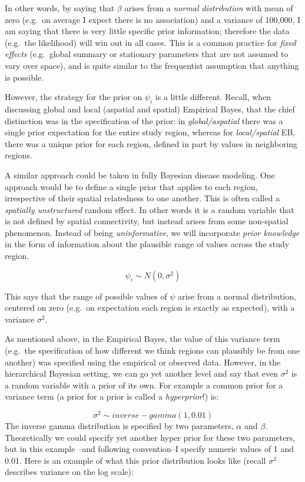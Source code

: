 \documentclass[
]{book}
\begin{document}
In other words, by saying that \(\beta\) arises from a \emph{normal distribution} with mean of zero (e.g.~on average I expect there is no association) and a variance of 100,000, I am saying that there is very little specific prior information; therefore the data (e.g.~the likelihood) will win out in all cases. This is a common practice for \emph{fixed effects} (e.g.~global summary or stationary parameters that are not assumed to vary over space), and is quite similar to the frequentist assumption that anything is possible.

However, the strategy for the prior on \(\psi_i\) is a little different. Recall, when discussing global and local (aspatial and spatial) Empirical Bayes, that the chief distinction was in the specification of the prior: in \emph{global/aspatial} there was a single prior expectation for the entire study region, whereas for \emph{local/spatial} EB, there was a unique prior for each region, defined in part by values in neighboring regions.

A similar approach could be taken in fully Bayesian disease modeling. One approach would be to define a single prior that applies to each region, irrespective of their spatial relatedness to one another. This is often called a \emph{spatially unstructured} random effect. In other words it is a random variable that is not defined by spatial connectivity, but instead arises from some non-spatial phenomenon. Instead of being \emph{uninformative}, we will incorporate \emph{prior knowledge} in the form of information about the plausible range of values across the study region.

\[\psi_i \sim N(0,\sigma^2)\]

This says that the range of possible values of \(\psi\) arise from a normal distribution, centered on zero (e.g.~on expectation each region is exactly as expected), with a variance \(\sigma^2\).

As mentioned above, in the Empirical Bayes, the value of this variance term (e.g.~the specification of how different we think regions can plausibly be from one another) was specified using the empirical or observed data. However, in the hierarchical Bayesian setting, we can go yet another level and say that even \(\sigma^2\) is a random variable with a prior of its own. For example a common prior for a variance term (a prior for a prior is called a \emph{hyperprior}!) is:

\[\sigma^2 \sim inverse-gamma(1, 0.01)\]
The inverse gamma distribution is specified by two parameters, \(\alpha\) and \(\beta\). Theoretically we could specify yet another hyper prior for these two parameters, but in this example --and following convention--I specify numeric values of 1 and 0.01. Here is an example of what this prior distribution looks like (recall \(\sigma^2\) describes variance on the log scale):
\end{document}
